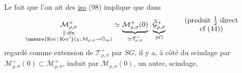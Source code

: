 Le fait que  l'on ait des \uline{iso} (98)
implique que dans
\[
\underset{\substack{\Vert\,\mathrm{dfn}\\
\unsure{\operatorname{Ker}|\operatorname{Ker}'}
(\chi:\mathcal M_{\rho,\sigma}\to \mathbb G_m)}}{\mathcal M_{\rho,\sigma}^{+}}
\simeq
\underbrace{\mathcal M_{\rho,\sigma}^{+}(0)}_{\simeq\mathcal T_{\rho,\sigma}^{+}}
\mathbin{.}
\underbrace{\widetilde{\mathcal G}_{\rho,\sigma}^{+}}_{SG}
\qquad\begin{array}{c}(\text{produit }\tfrac12\text{ direct}\\\text{cf (44)})\end{array}
\]
regardé comme extension de $\mathcal T_{\rho,\sigma}^{+}$ par $SG$,
il y a, à côté du scindage par $\mathcal M_{\rho,\sigma}^{+}(0)\subset\mathcal M_{\rho,\sigma}^{+}$,
induit par $\mathcal M_{\rho,\sigma}(0)$, un autre, scindage,

\par{}
